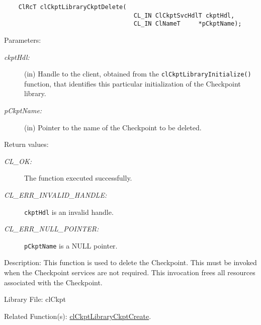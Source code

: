 \begin{flushleft}
\begin{Desc}
\footnotesize\begin{verbatim}    ClRcT clCkptLibraryCkptDelete(
                                	CL_IN ClCkptSvcHdlT ckptHdl,
                                	CL_IN ClNameT     *pCkptName);
\end{verbatim}
\normalsize
\end{Desc}
\begin{Desc}
\item[Parameters:]
\begin{description}
\item[{\em ckpt\-Hdl:}](in) Handle to the client, obtained from the {\tt{clCkptLibraryInitialize()}} function, that identifies this particular 
initialization of the Checkpoint library. \item[{\em p\-Ckpt\-Name:}](in) Pointer to the name of the Checkpoint to be deleted.\end{description}
\end{Desc}
\begin{Desc}
\item[Return values:]
\begin{description}
\item[{\em CL\_\-OK:}]The function executed successfully. \item[{\em CL\_\-ERR\_\-INVALID\_\-HANDLE:}]{\tt{ckptHdl}} is an invalid handle.
\item[{\em CL\_\-ERR\_\-NULL\_\-POINTER:}]{\tt{pCkptName}} is a NULL pointer.\end{description}
\end{Desc}
\begin{Desc}
\item[Description:]This function is used to delete the Checkpoint. This must be invoked when the Checkpoint services are not required. This 
invocation frees all resources associated with the Checkpoint. 
\end{Desc}
\begin{Desc}
\item[Library File:]cl\-Ckpt\end{Desc}
\begin{Desc}
\item[Related Function(s):]\hyperlink{pageckpt203}{cl\-Ckpt\-Library\-Ckpt\-Create}. \end{Desc}
\newpage



\end{flushleft}
